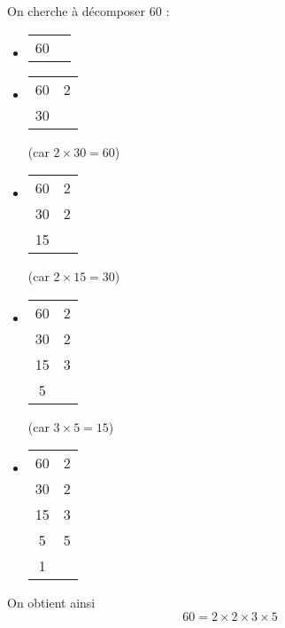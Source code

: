 \documentclass[a4paper]{article}
\begin{document}
\begin{exemple}
	On cherche à décomposer $60$ :
	\begin{itemize}
		\setlength\itemsep{0.4em}
		\item[∙] \begin{tabular}{c|c}
			      60 &
		      \end{tabular}
		\item[∙] \begin{tabular}{c|c}
			      60 & 2 \\
			      30 &
		      \end{tabular} (car $2 × 30 = 60$)
		\item[∙] \begin{tabular}{c|c}
			      60 & 2 \\
			      30 & 2 \\
			      15 &
		      \end{tabular} (car $2 × 15 = 30$)
		\item[∙] \begin{tabular}{c|c}
			      60 & 2 \\
			      30 & 2 \\
			      15 & 3 \\
			      5  &
		      \end{tabular} (car $3 × 5 = 15$)
		\item[∙] \begin{tabular}{c|c}
			      60 & 2 \\
			      30 & 2 \\
			      15 & 3 \\
			      5  & 5 \\
			      1  &
		      \end{tabular}
	\end{itemize}

	On obtient ainsi $$ 60 = 2 × 2 × 3 × 5 $$
\end{exemple}
\end{document}
